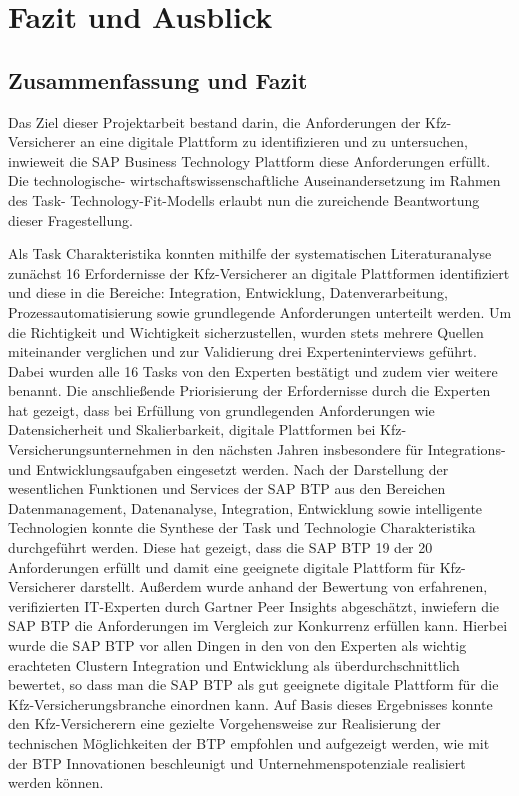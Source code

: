 \chapter{Fazit und Ausblick}

\section{Zusammenfassung und Fazit}

Das Ziel dieser Projektarbeit bestand darin, die Anforderungen der Kfz-Versicherer an eine digitale Plattform zu identifizieren und zu untersuchen, inwieweit die SAP Business Technology Plattform diese Anforderungen erfüllt. Die technologische- wirtschaftswissenschaftliche Auseinandersetzung im Rahmen des Task- Technology-Fit-Modells erlaubt nun die zureichende Beantwortung dieser Fragestellung.

Als Task Charakteristika konnten mithilfe der systematischen Literaturanalyse zunächst 16 Erfordernisse der Kfz-Versicherer an digitale Plattformen identifiziert und diese in die Bereiche: Integration, Entwicklung, Datenverarbeitung, Prozessautomatisierung sowie grundlegende Anforderungen unterteilt werden. Um die Richtigkeit und Wichtigkeit sicherzustellen, wurden stets mehrere Quellen miteinander verglichen und zur Validierung drei Experteninterviews geführt. Dabei wurden alle 16 Tasks von den Experten bestätigt und zudem vier weitere benannt. Die anschließende Priorisierung der Erfordernisse durch die Experten hat gezeigt, dass bei Erfüllung von grundlegenden Anforderungen wie Datensicherheit und Skalierbarkeit, digitale Plattformen bei Kfz-Versicherungsunternehmen in den nächsten Jahren insbesondere für Integrations- und Entwicklungsaufgaben eingesetzt werden. Nach der Darstellung der wesentlichen Funktionen und Services der SAP BTP aus den Bereichen Datenmanagement, Datenanalyse, Integration, Entwicklung sowie intelligente Technologien konnte die Synthese der Task und Technologie Charakteristika durchgeführt werden. Diese hat gezeigt, dass die SAP BTP 19 der 20 Anforderungen erfüllt und damit eine geeignete digitale Plattform für Kfz-Versicherer darstellt. Außerdem wurde anhand der Bewertung von erfahrenen, verifizierten IT-Experten durch Gartner Peer Insights abgeschätzt, inwiefern die SAP BTP die Anforderungen im Vergleich zur Konkurrenz erfüllen kann. Hierbei wurde die SAP BTP vor allen Dingen in den von den Experten als wichtig erachteten Clustern Integration und Entwicklung als überdurchschnittlich bewertet, so dass man die SAP BTP als gut geeignete digitale Plattform für die Kfz-Versicherungsbranche einordnen kann. Auf Basis dieses Ergebnisses konnte den Kfz-Versicherern eine gezielte Vorgehensweise zur Realisierung der technischen Möglichkeiten der BTP empfohlen und aufgezeigt werden, wie mit der BTP Innovationen beschleunigt und Unternehmenspotenziale realisiert werden können.


